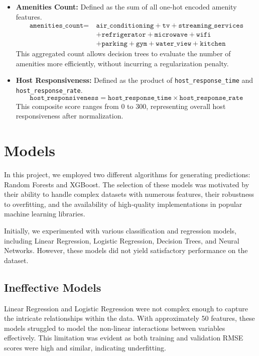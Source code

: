 \documentclass[12pt]{article}
\begin{document}
\begin{itemize}
    \item \textbf{Amenities Count:} Defined as the sum of all one-hot encoded amenity features.
    \[
    \begin{aligned}
    \texttt{amenities\_count} =\ & \texttt{air\_conditioning} + \texttt{tv} + \texttt{streaming\_services} \\
    & + \texttt{refrigerator} + \texttt{microwave} + \texttt{wifi} \\
    & + \texttt{parking} + \texttt{gym} + \texttt{water\_view} + \texttt{kitchen}
    \end{aligned}
    \]        
    This aggregated count allows decision trees to evaluate the number of amenities more efficiently, without incurring a regularization penalty.
    
    \item \textbf{Host Responsiveness:} Defined as the product of \texttt{host\_response\_time} and \texttt{host\_response\_rate}.
    \[
    \texttt{host\_responsiveness} = \texttt{host\_response\_time} \times \texttt{host\_response\_rate}
    \]
    This composite score ranges from 0 to 300, representing overall host responsiveness after normalization.
\end{itemize}

\section{Models}

In this project, we employed two different algorithms for generating predictions: Random Forests and XGBoost. The selection of these models was motivated by their ability to handle complex datasets with numerous features, their robustness to overfitting, and the availability of high-quality implementations in popular machine learning libraries.

Initially, we experimented with various classification and regression models, including Linear Regression, Logistic Regression, Decision Trees, and Neural Networks. However, these models did not yield satisfactory performance on the dataset.

\subsection{Ineffective Models}

Linear Regression and Logistic Regression were not complex enough to capture the intricate relationships within the data. With approximately 50 features, these models struggled to model the non-linear interactions between variables effectively. This limitation was evident as both training and validation RMSE scores were high and similar, indicating underfitting.
\end{document}
